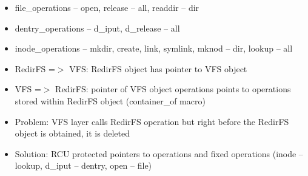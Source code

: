 \documentclass[30pt,a4paper,landscape,headrule,footrule]{foils}
\begin{document}
\begin{itemize}
\item file\_operations -- open, release -- all, readdir -- dir
\item dentry\_operations -- d\_iput, d\_release -- all
\item inode\_operations -- mkdir, create, link, symlink, mknod -- dir, lookup --
all
\end{itemize}

\begin{itemize}
\item RedirFS =$>$ VFS: RedirFS object has pointer to VFS object
\item VFS =$>$ RedirFS: pointer of VFS object operations points to operations
stored within RedirFS object (container\_of macro)
\item Problem: VFS layer calls RedirFS operation but right before the
RedirFS object is obtained, it is deleted
\item Solution: RCU protected pointers to operations and fixed operations
(inode -- lookup, d\_iput -- dentry, open -- file)
\end{itemize}


\end{document}
